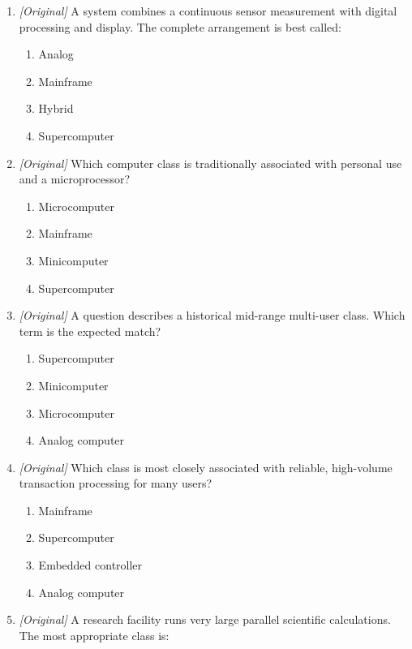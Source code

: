 \begin{enumerate}[label=\textbf{Q\arabic*.}, leftmargin=*]
\begin{enumerate}[label=\Alph*.]
    \item Digital
    \item Hybrid only
    \item Minicomputer
  \end{enumerate}
\item \textit{[Original]} A system combines a continuous sensor measurement
  with digital processing and display. The complete arrangement is best
  called:
  \begin{enumerate}[label=\Alph*.]
    \item Analog
    \item Mainframe
    \item Hybrid
    \item Supercomputer
  \end{enumerate}
\item \textit{[Original]} Which computer class is traditionally associated
  with personal use and a microprocessor?
  \begin{enumerate}[label=\Alph*.]
    \item Microcomputer
    \item Mainframe
    \item Minicomputer
    \item Supercomputer
  \end{enumerate}
\item \textit{[Original]} A question describes a historical mid-range
  multi-user class. Which term is the expected match?
  \begin{enumerate}[label=\Alph*.]
    \item Supercomputer
    \item Minicomputer
    \item Microcomputer
    \item Analog computer
  \end{enumerate}
\item \textit{[Original]} Which class is most closely associated with
  reliable, high-volume transaction processing for many users?
  \begin{enumerate}[label=\Alph*.]
    \item Mainframe
    \item Supercomputer
    \item Embedded controller
    \item Analog computer
  \end{enumerate}
\item \textit{[Original]} A research facility runs very large parallel
  scientific calculations. The most appropriate class is:

\end{enumerate}
